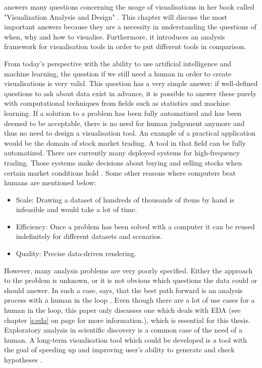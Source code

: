 \citeauthor{Munzner2014} answers many questions concerning the usage of visualisations in her book called "Visualization Analysis and Design" . This chapter will discuss the most important answers because they are a necessity in understanding the questions of when, why and how to visualise. Furthermore, it introduces an analysis framework for visualisation tools in order to
put different tools in comparison.

From today's perspective with the ability to use artificial intelligence and machine learning, the question if we still need a human in order to create visualisations is very valid. This question has a very simple answer: if well-defined questions to ask about data exist in advance, it is possible to answer these purely with computational techniques from fields such as statistics and machine learning. If a solution to a problem has been fully automatized and has been deemed to be acceptable, there is no need for human judgement anymore and thus no need to design a visualisation tool. An example of a practical application would be the domain of stock market trading. A tool in that field can be fully automatized. There are currently many deployed systems for high-frequency trading. Those systems make decisions about buying and selling stocks when certain market conditions hold . Some other reasons where computers beat humans are mentioned below:
\begin{itemize}
\item Scale: Drawing a dataset of hundreds of thousands of items by hand is infeasible and would take a lot of time.
\item Efficiency: Once a problem has been solved with a computer it can be reused  indefinitely for different datasets and scenarios.
\item Quality: Precise data-driven rendering.
\end{itemize}
However, many analysis problems are very poorly specified. Either the approach to the problem is unknown, or it is not obvious which questions the data could or should answer. In such a case, \citeauthor{Munzner2014} says, that the best path forward is an analysis process with a human in the loop . Even though there are a lot of use cases for a human in the loop, this paper only discusses one which deals with \ac{EDA} (see chapter \ref{s:eda} on page \pageref{s:eda} for more information.), which is essential for this thesis. Exploratory analysis in scientific discovery is a common case of the need of a human. A long-term visualisation tool which could be developed is a tool with the goal of speeding up and improving user's ability to generate and check hypotheses .

